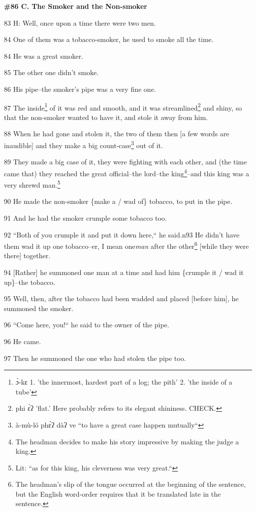 
\textbf{\#86 C. The Smoker and the Non-smoker}

83 H: Well, once upon a time there were two men.

84 One of them was a tobacco-smoker, he used to smoke all the time.

84 He was a great smoker.

85 The other one didn't smoke.

86 His pipe--the smoker's pipe was a very fine one.

87 The inside\footnote{ɔ̀-kɛ 1. 'the innermost, hardest part of a log; the pith' 2. 'the inside of a tube'} of it was red and smooth, and it was streamlined\footnote{phi ɛ̀ʔ 'flat.' Here probably refers to its elegant shininess. CHECK.} and shiny,
so that the non-smoker wanted to have it, and stole it away from him.

88 When he had gone and stolen it, the two of them then [a few words are inaudible]
and they make a big count-case\footnote{à-mù-ló phɛ̀ʔ dàʔ ve ``to have a great case happen mutually``} out of it.

89 They made a big case of it, they were fighting with each other, and (the time
came that) they reached the great official--the lord--the king\footnote{The headman decides to make his story impressive by making the judge a king.}--and this king
was a very shrewd man.\footnote{Lit: ``as for this king, his cleverness was very great.``}

90 He made the non-smoker \{make a / wad of\} tobacco, to put in the pipe.

91 And he had the smoker crumple some tobacco too.

92 ``Both of you crumple it and put it down here,`` he said.n93
He didn't have them wad it up one tobacco--er, I mean one\textit{man} after the
other\footnote{The headman's slip of the tongue occurred at the beginning of the sentence, but the English word-order requires that it be translated late in the sentence.} [while they were there] together.

94 [Rather] he summoned one man at a time and had him \{crumple it / wad it up\}--the
tobacco.

95 Well, then, after the tobacco had been wadded and placed [before him], he summoned
the smoker.

96 ``Come here, you!`` he said to the owner of the pipe.

96 He came.

97 Then he summoned the one who had stolen the pipe too.

